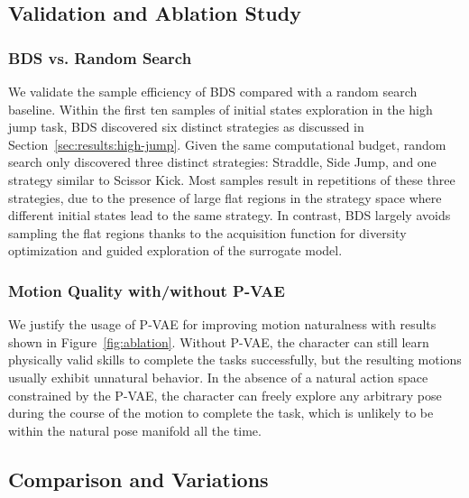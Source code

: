 \subsection{Validation and Ablation Study}
\label{sec:Experiments-Comparison-and-Ablation-Study}

\subsubsection{BDS vs. Random Search}
\label{sec:comparison-bds-random-search}
We validate the sample efficiency of BDS compared with a random search baseline. Within the first ten samples of initial states exploration in the high jump task, BDS discovered six distinct strategies as discussed in Section~\ref{sec:results:high-jump}. Given the same computational budget, random search only discovered three distinct strategies: Straddle, Side Jump, and one strategy similar to Scissor Kick. Most samples result in repetitions of these three strategies, due to the presence of large flat regions in the strategy space where different initial states lead to the same strategy. In contrast, BDS largely avoids sampling the flat regions thanks to the acquisition function for diversity optimization and guided exploration of the surrogate model.

\subsubsection{Motion Quality with/without P-VAE}
We justify the usage of P-VAE for improving motion naturalness with results shown in Figure~\ref{fig:ablation}. Without P-VAE, the character can still learn physically valid skills to complete the tasks successfully, but the resulting motions usually exhibit unnatural behavior. In the absence of a natural action space constrained by the P-VAE, the character can freely explore any arbitrary pose during the course of the motion to complete the task, which is unlikely to be within the natural pose manifold all the time.

\subsection{Comparison and Variations}
\label{sec:Results-variations}

